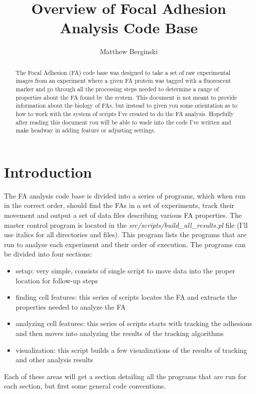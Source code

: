 \documentclass[letterpaper]{article}
\title{Overview of Focal Adhesion Analysis Code Base}
\author{Matthew Berginski}
\begin{document}
\maketitle

\begin{abstract}
	The Focal Adhesion (FA) code base was designed to take a set of raw
	experimental images from an experiment where a given FA protein was tagged
	with a fluorescent marker and go through all the processing steps needed to
	determine a range of properties about the FA found by the system. This
	document is not meant to provide information about the biology of FAs, but
	instead to given you some orientation as to how to work with the system of
	scripts I've created to do the FA analysis. Hopefully after reading this
	document you will be able to wade into the code I've written and make
	headway in adding feature or adjusting settings.
\end{abstract}

\section{Introduction}
	The FA analysis code base is divided into a series of programs, which when run
	in the correct order, should find the FAs in a set of experiments, track their
	movement and output a set of data files describing various FA properties. The
	master control program is located in the
	\emph{src/scripts/build\_all\_results.pl} file (I'll use italics for all
	directories and files). This program lists the programs that are run to analyse
	each experiment and their order of execution. The programs can be divided into
	four sections:

		\begin{itemize}
		\item setup: very simple, consists of single script to move data into the
		proper location for follow-up steps
		\item finding cell features: this series of scripts locates the FA and
		extracts the properties needed to analyze the FA
		\item analyzing cell features: this series of scripts starts with tracking
		the adhesions and then moves into analyzing the results of the tracking
		algorithms
		\item visualization: this script builds a few visualizations of the results
		of tracking and other analysis results
		\end{itemize}

	Each of these areas will get a section detailing all the programs that are run
	for each section, but first some general code conventions.
\end{document}
